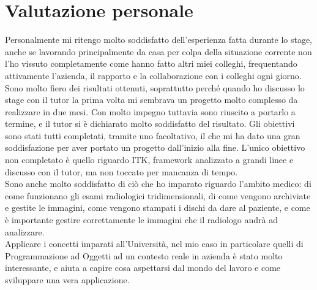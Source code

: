 \section{Valutazione personale}
Personalmente mi ritengo molto soddisfatto dell'esperienza fatta durante lo stage, anche se lavorando principalmente da casa per colpa della situazione corrente non l'ho vissuto completamente come hanno fatto altri miei colleghi, frequentando attivamente l'azienda, il rapporto e la collaborazione con i colleghi ogni giorno. Sono molto fiero dei risultati ottenuti, soprattutto perché quando ho discusso lo stage con il tutor la prima volta mi sembrava un progetto molto complesso da realizzare in due mesi. Con molto impegno tuttavia sono riuscito a portarlo a termine, e il tutor si è dichiarato molto soddisfatto del risultato. Gli obiettivi sono stati tutti completati, tramite uno facoltativo, il che mi ha dato una gran soddisfazione per aver portato un progetto dall'inizio alla fine. L'unico obiettivo non completato è quello riguardo ITK, framework analizzato a grandi linee e discusso con il tutor, ma non toccato per mancanza di tempo.
\\
Sono anche molto soddisfatto di ciò che ho imparato riguardo l'ambito medico: di come funzionano gli esami radiologici tridimensionali, di come vengono archiviate e gestite le immagini, come vengono stampati i dischi da dare al paziente, e come è importante gestire correttamente le immagini che il radiologo andrà ad analizzare.
\\
Applicare i concetti imparati all'Università, nel mio caso in particolare quelli di Programmazione ad Oggetti ad un contesto reale in azienda è stato molto interessante, e aiuta a capire cosa aspettarsi dal mondo del lavoro e come sviluppare una vera applicazione.
